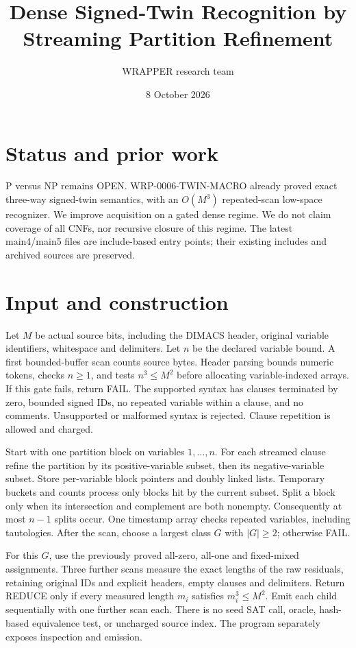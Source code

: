 \documentclass[11pt]{article}
\title{Dense Signed-Twin Recognition by Streaming Partition Refinement}
\author{WRAPPER research team}\date{8 October 2026}
\begin{document}
\maketitle
\section{Status and prior work}
P versus NP remains OPEN. WRP-0006-TWIN-MACRO already proved exact
three-way signed-twin semantics, with an $O(M^3)$ repeated-scan low-space
recognizer. We improve acquisition on a gated dense regime. We do not
claim coverage of all CNFs, nor recursive closure of this regime.
The latest main4/main5 files are include-based entry points; their existing
includes and archived sources are preserved.

\section{Input and construction}
Let $M$ be actual source bits, including the DIMACS header, original
variable identifiers, whitespace and delimiters. Let $n$ be the declared
variable bound. A first bounded-buffer scan counts source bytes. Header
parsing bounds numeric tokens, checks $n\ge1$, and tests $n^3\le M^2$
before allocating variable-indexed arrays. If this gate fails, return FAIL.
The supported syntax has clauses terminated by zero, bounded signed IDs,
no repeated variable within a clause, and no comments. Unsupported or
malformed syntax is rejected. Clause repetition is allowed and charged.

Start with one partition block on variables $1,\ldots,n$. For each
streamed clause refine the partition by its positive-variable subset,
then its negative-variable subset. Store per-variable block pointers and
doubly linked lists. Temporary buckets and counts process only blocks hit
by the current subset. Split a block only when its intersection and
complement are both nonempty. Consequently at most $n-1$ splits occur.
One timestamp array checks repeated variables, including tautologies.
After the scan, choose a largest class $G$ with $|G|\ge2$; otherwise FAIL.

For this $G$, use the previously proved all-zero, all-one and fixed-mixed
assignments. Three further scans measure the exact lengths of the raw
residuals, retaining original IDs and explicit headers, empty clauses and
delimiters. Return REDUCE only if every measured length $m_i$ satisfies
$m_i^3\le M^2$. Emit each child sequentially with one further scan each.
There is no seed SAT call, oracle, hash-based equivalence test, or uncharged
source index. The program separately exposes inspection and emission.
\end{document}
